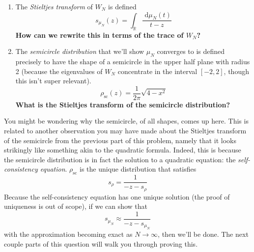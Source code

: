 \documentclass[a4paper]{article}
\begin{document}
\begin{enumerate}
    \item The \textit{Stieltjes transform} of $ W_N $ is defined
        $$ s_{\mu_N}(z) = \int_\mathbb{R} \frac{\text{ d} \mu_N(t)}{t - z} $$
    \textbf{How can we rewrite this in terms of the trace of $ W_N $?}
        
    \item The \textit{semicircle distribution} that we'll show $ \mu_N $ converges to is defined precisely to have the shape of a semicircle in the upper half plane with radius 2 (because the eigenvalues of $ W_N $ concentrate in the interval $ [-2, 2] $, though this isn't super relevant).
        $$ \rho_\text{sc}(z) = \frac{1}{2 \pi} \sqrt{4 - x^2} $$
    \textbf{What is the Stieltjes transform of the semicircle distribution?}
        
    \end{enumerate}
        
You might be wondering why the semicircle, of all shapes, comes up here. This is related to another observation you may have made about the Stieltjes transform of the semicircle from the previous part of this problem, namely that it looks strikingly like something akin to the quadratic formula. Indeed, this is because the semicircle distribution is in fact the solution to a quadratic equation: the \textit{self-consistency equation}. $ \rho_\text{sc} $ is the unique distribution that satisfies
    $$ s_\rho = \frac{1}{-z - s_\rho} $$
Because the self-consistency equation has one unique solution (the proof of uniqueness is out of scope), if we can show that
    $$ s_{\mu_N} \approx \frac{1}{-z - s_{\mu_N}} $$
with the approximation becoming exact as $ N \to \infty $, then we'll be done. The next couple parts of this question will walk you through proving this.
\end{document}
